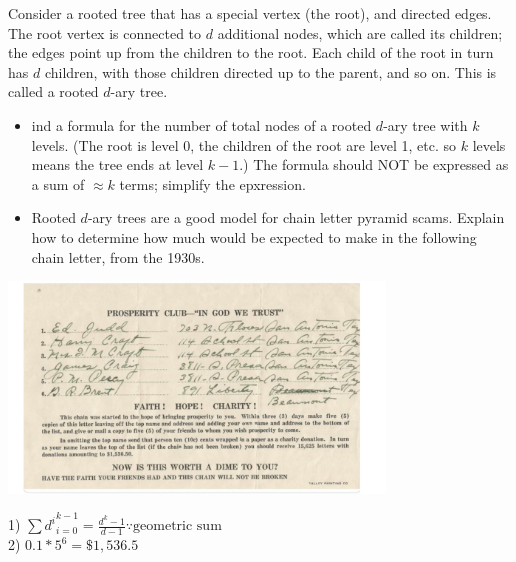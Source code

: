 \documentclass[solution,letterpaper]{cs20}
\begin{document}
    \begin{problem}
        Consider a rooted tree that has a special vertex (the root), and
        directed edges.  The root vertex is connected to $d$ additional nodes,
        which are called its children; the edges point up from the children to the
        root.  Each child of the root in turn has $d$ children, with those children directed
        up to the parent, and so on.  This is called a rooted $d$-ary tree.
        \begin{itemize}
            \item
            ind a formula for the number of total nodes of a rooted $d$-ary
            tree with $k$ levels.  (The root is level 0, the children of the root
            are level 1, etc. so $k$ levels means the tree ends at level $k-1$.)
            The formula should NOT be expressed as a sum of $\approx k$ terms;
            simplify the epxression.
            \item
            Rooted $d$-ary trees are a good model for chain letter pyramid scams.
            Explain how to determine how much would be expected to make in the
            following chain letter, from the 1930s.
        \end{itemize}

        \includegraphics[width=10cm]{ChainMailLetter.pdf}

        \begin{solution}
            1) $\sum{d^i}^{k-1}_{i=0} = \frac{d^k - 1}{d - 1} \because \text{geometric sum}$ \\
            2) $0.1 * 5^6 = \$1,536.5$
        \end{solution}
    \end{problem}
    \newpage
\end{document}
